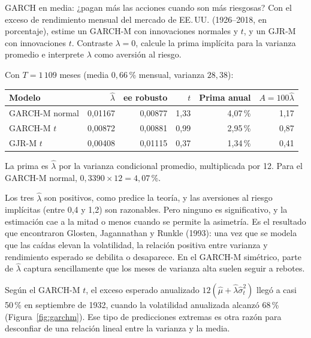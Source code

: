 \begin{ejresuelto}{GARCH en media: ¿pagan más las acciones cuando son más riesgosas?}\label{ej:garchm}
\enunciado Con el exceso de rendimiento mensual del mercado de EE.\,UU. (1926--2018, en porcentaje), estime un
GARCH-M con innovaciones normales y $t$, y un GJR-M con innovaciones $t$. Contraste $\lambda=0$, calcule la prima
implícita para la varianza promedio e interprete $\lambda$ como aversión al riesgo.

\solucion
{} Con $T=1\,109$ meses (media $0{,}66$\,\% mensual, varianza $28{,}38$):
\begin{center}\small
\begin{tabular}{@{}lrrrrr@{}}
\toprule
Modelo & $\hat\lambda$ & ee robusto & $t$ & Prima anual & $A=100\hat\lambda$ \\
\midrule
GARCH-M normal & 0,01167 & 0,00877 & 1,33 & 4,07\,\% & 1,17 \\
GARCH-M $t$    & 0,00872 & 0,00881 & 0,99 & 2,95\,\% & 0,87 \\
GJR-M $t$      & 0,00408 & 0,01115 & 0,37 & 1,34\,\% & 0,41 \\
\bottomrule
\end{tabular}
\end{center}
La prima es $\hat\lambda$ por la varianza condicional promedio, multiplicada por 12. Para el GARCH-M normal,
$0{,}3390\times12=4{,}07$\,\%.

 Los tres $\hat\lambda$ son positivos, como predice la teoría, y las aversiones
al riesgo implícitas (entre 0,4 y 1,2) son razonables. Pero ninguno es significativo, y la estimación cae a la
mitad o menos cuando se permite la asimetría. Es el resultado que encontraron Glosten, Jagannathan y Runkle
(1993): una vez que se modela que las caídas elevan la volatilidad, la relación positiva entre varianza y
rendimiento esperado se debilita o desaparece. En el GARCH-M simétrico, parte de $\hat\lambda$ captura
sencillamente que los meses de varianza alta suelen seguir a rebotes.

 Según el GARCH-M $t$, el exceso esperado anualizado
$12(\hat\mu+\hat\lambda\hat\sigma_t^2)$ llegó a casi 50\,\% en septiembre de 1932, cuando la volatilidad anualizada
alcanzó 68\,\%
(Figura~\ref{fig:garchm}). Ese tipo de predicciones extremas es otra razón para desconfiar de una relación lineal
entre la varianza y la media.



\end{ejresuelto}

